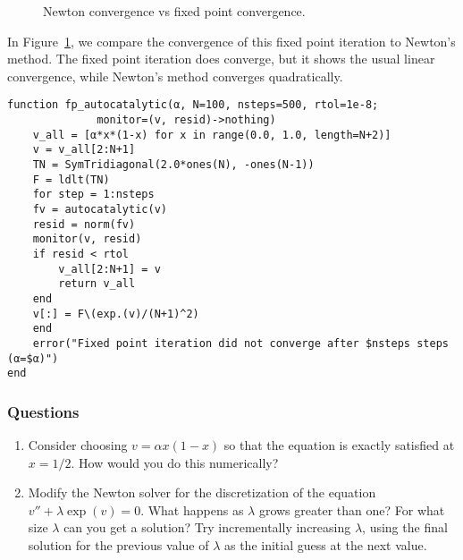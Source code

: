 \documentclass[12pt, leqno]{article} %
\begin{document}
\begin{figure}
\caption{Newton convergence vs fixed point convergence.}
\label{fig:fp}
\end{figure}

In Figure~\ref{fig:fp}, we compare the convergence of this fixed point
iteration to Newton's method.  The fixed point iteration does
converge, but it shows the usual linear convergence, while Newton's
method converges quadratically.

\begin{verbatim}
function fp_autocatalytic(α, N=100, nsteps=500, rtol=1e-8;
			  monitor=(v, resid)->nothing)
    v_all = [α*x*(1-x) for x in range(0.0, 1.0, length=N+2)]
    v = v_all[2:N+1]
    TN = SymTridiagonal(2.0*ones(N), -ones(N-1))
    F = ldlt(TN)
    for step = 1:nsteps
	fv = autocatalytic(v)
	resid = norm(fv)
	monitor(v, resid)
	if resid < rtol
	    v_all[2:N+1] = v
	    return v_all
	end
	v[:] = F\(exp.(v)/(N+1)^2)
    end
    error("Fixed point iteration did not converge after $nsteps steps (α=$α)")
end
\end{verbatim}

\subsubsection{Questions}

\begin{enumerate}
\def\labelenumi{\arabic{enumi}.}
\item
  Consider choosing \(v = \alpha x (1-x)\) so that the equation is
  exactly satisfied at \(x = 1/2\). How would you do this numerically?
\item
  Modify the Newton solver for the discretization of the equation
  \(v'' + \lambda \exp(v) = 0\). What happens as \(\lambda\) grows
  greater than one? For what size \(\lambda\) can you get a solution?
  Try incrementally increasing \(\lambda\), using the final solution for
  the previous value of \(\lambda\) as the initial guess at the next
  value.
\end{enumerate}
\end{document}
